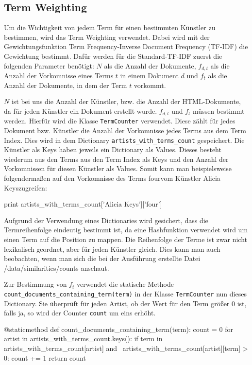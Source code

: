 \documentclass[prodmode,acmtecs]{acmsmall} %
\begin{document}
\subsection{Term Weighting}
Um die Wichtigkeit von jedem Term für einen bestimmten Künstler zu bestimmen, wird das Term Weighting verwendet. Dabei wird mit der Gewichtungsfunktion Term Frequency-Inverse Document Frequency (TF-IDF) die Gewichtung bestimmt. Dafür werden für die Standard-TF-IDF zuerst die folgenden Parameter benötigt: $N$ als die Anzahl der Dokumente, $f_{d,t}$ als die Anzahl der Vorkomnisse eines Terms $t$ in einem Dokument $d$ und $f_t$ als die Anzahl der Dokumente, in dem der Term $t$ vorkommt. 

$N$ ist bei uns die Anzahl der Künstler, bzw. die Anzahl der HTML-Dokumente, da für jeden Künstler ein Dokument erstellt wurde. $f_{d,t}$ und $f_t$ müssen bestimmt werden. Hierfür wird die Klasse \texttt{TermCounter} verwendet. Diese zählt für jedes Dokument bzw. Künstler die Anzahl der  Vorkomnisse jedes Terms aus dem Term Index. Dies wird in dem Dictionary \texttt{artists\_with\_terms\_count} gespeichert. Die Künstler als Keys haben jeweils ein Dictionary als Values. Dieses besteht wiederum aus den Terms aus den Term Index als Keys und den Anzahl der Vorkomnissen für diesen Künstler als Values. 
Somit kann man beispielsweise folgendermaßen auf den Vorkomnisse des Terms \glqq four\grqq vom Künstler \glqq Alicia Keys\grqq zugreifen:
\begin{python}
    print artists_with_terms_count['Alicia Keys']['four']
\end{python}
Aufgrund der Verwendung eines Dictionaries wird gesichert, dass die Termreihenfolge eindeutig bestimmt ist, da eine Hashfunktion verwendet wird um einen Term auf die Position zu mappen. Die Reihenfolge der Terme ist zwar nicht lexikalisch geordnet, aber für jeden Künstler gleich. Dies kann man auch beobachten, wenn man sich die bei der Ausführung erstellte Datei /data/similarities/counts anschaut.

Zur Bestimmung von $f_t$ verwendet die statische Methode \texttt{count\_documents\_containing\_term(term)} in der Klasse \texttt{TermCounter} nun dieses Dictionary. Sie überprüft für jeden Artist, ob der Wert für den Term größer 0 ist, falls ja, so wird der Counter \texttt{count} um eins erhöht.
\begin{python}
    @staticmethod
    def count_documents_containing_term(term):
        count = 0
        for artist in artists_with_terms_count.keys():
            if term in artists_with_terms_count[artist] and \ 		       artists_with_terms_count[artist][term] > 0:
                count += 1
        return count
\end{python}       
\end{document}
